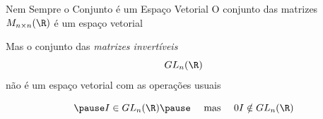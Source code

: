 \documentclass[fleqn,aspectratio=169,12pt]{beamer}
\begin{document}
\begin{frame}{Nem Sempre o Conjunto é um Espaço Vetorial}
  O conjunto das matrizes
  \(
    M_{n\times n}(\R)
  \)
  é um espaço vetorial

  \pause
  Mas o conjunto das \emph{matrizes invertíveis}
  \[
    GL_n(\R)
  \]
  \pause
  não é um espaço vetorial com as operações usuais

  \[
    \pause
    I \in GL_n(\R)
    \pause
    \quad\text{ mas }\quad
    0I \notin GL_n(\R)
  \]
\end{frame}

%
%

\end{document}
